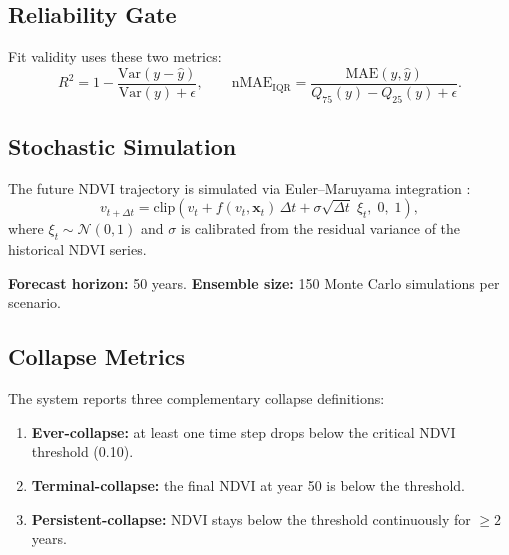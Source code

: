 \documentclass[12pt, a4paper]{article}
\begin{document}
\subsection{Reliability Gate}

Fit validity uses these two metrics:
\begin{equation}
    R^2 = 1 - \frac{\text{Var}(y - \hat{y})}{\text{Var}(y) + \epsilon}, \qquad
    \text{nMAE}_{\text{IQR}} = \frac{\text{MAE}(y, \hat{y})}{Q_{75}(y) - Q_{25}(y) + \epsilon}.
\end{equation}

\subsection{Stochastic Simulation}

The future NDVI trajectory is simulated via Euler--Maruyama integration \cite{kloeden1992}:
\begin{equation}
    v_{t+\Delta t} = \text{clip}\!\left(v_t + f(v_t, \mathbf{x}_t)\,\Delta t + \sigma\sqrt{\Delta t}\;\xi_t,\; 0,\; 1\right),
    \label{eq:sde}
\end{equation}
where $\xi_t \sim \mathcal{N}(0,1)$ and $\sigma$ is calibrated from the residual variance of the historical NDVI series.

\textbf{Forecast horizon:} 50 years. \textbf{Ensemble size:} 150 Monte Carlo simulations per scenario.

\subsection{Collapse Metrics}

The system reports three complementary collapse definitions:
\begin{enumerate}[leftmargin=1.6em]
    \item \textbf{Ever-collapse:} at least one time step drops below the critical NDVI threshold (0.10).
    \item \textbf{Terminal-collapse:} the final NDVI at year 50 is below the threshold.
    \item \textbf{Persistent-collapse:} NDVI stays below the threshold continuously for $\geq 2$ years.
\end{enumerate}

\end{document}
